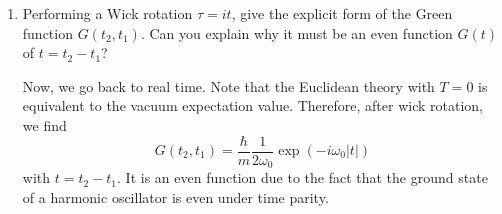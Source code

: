    \begin{enumerate}[label=\alph*), resume]
    
        \item Performing a Wick rotation $\tau = it$, give the explicit form of the Green function $G(t_2, t_1)$. Can you explain why it must be an even function $G(t)$ of $t = t_2 - t_1$?
        \begin{solution}
            Now, we go back to real time. Note that the Euclidean theory with $T=0$ is equivalent to the vacuum expectation value. Therefore, after wick rotation, we find
            \begin{equation}
                G(t_2,t_1) = \frac{\hbar}{m}\frac{1}{2\omega_0}\exp(-i\omega_0|t|)
            \end{equation}
            with $t=t_2-t_1$. It is an even function due to the fact that the ground state of a harmonic oscillator is even under time parity.
        \end{solution}
    

\end{enumerate}
